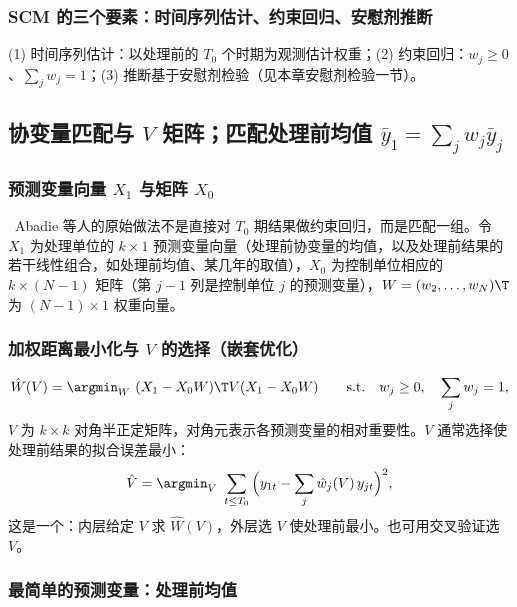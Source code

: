 \subsubsection{SCM 的三个要素：时间序列估计、约束回归、安慰剂推断}

\begin{summary}
(1) 时间序列估计：以处理前的 $T_0$ 个时期为观测估计权重；(2) 约束回归：$w_j\ge0$、$\sum_jw_j=1$；(3) 推断基于安慰剂检验（见本章安慰剂检验一节）。
\end{summary}

\subsection{协变量匹配与 \texorpdfstring{$V$}{V} 矩阵；匹配处理前均值 \texorpdfstring{$\bar y_1=\sum_j w_j\bar y_j$}{y1-bar = sum w\_j yj-bar}}

\subsubsection{预测变量向量 \texorpdfstring{$X_1$}{X1} 与矩阵 \texorpdfstring{$X_0$}{X0}}

\tagext\ Abadie 等人的原始做法不是直接对 $T_0$ 期结果做约束回归，而是匹配一组。令 $X_1$ 为处理单位的 $k\times1$ 预测变量向量（处理前协变量的均值，以及处理前结果的若干线性组合，如处理前均值、某几年的取值），$X_0$ 为控制单位相应的 $k\times(N-1)$ 矩阵（第 $j-1$ 列是控制单位 $j$ 的预测变量），$W=(w_2,\dots,w_N)\T$ 为 $(N-1)\times1$ 权重向量。

\subsubsection{加权距离最小化与 \texorpdfstring{$V$}{V} 的选择（嵌套优化）}

\[
\hat W(V)=\argmin_W\ (X_1-X_0W)\T V(X_1-X_0W)\qquad\text{s.t.}\quad w_j\ge0,\quad\sum_j w_j=1,
\]
$V$ 为 $k\times k$ 对角半正定矩阵，对角元表示各预测变量的相对重要性。$V$ 通常选择使处理前结果的拟合误差最小：
\[
\hat V=\argmin_V\ \sum_{t\le T_0}\Big(y_{1t}-\sum_j \hat w_j(V)\,y_{jt}\Big)^2,
\]
这是一个：内层给定 $V$ 求 $\hat W(V)$，外层选 $V$ 使处理前最小。也可用交叉验证选 $V$。

\subsubsection{最简单的预测变量：处理前均值}

